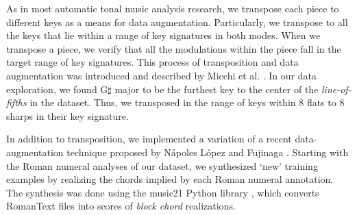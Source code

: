 

As in most automatic tonal music analysis research, we
transpose each piece to different keys as a means for data
augmentation. Particularly, we transpose to all the keys
that lie within a range of key signatures in both modes.
When we transpose a piece, we verify that all the
modulations within the piece fall in the target range of key
signatures. This process of transposition and data
augmentation was introduced and described by Micchi et al.
\parencite{micchi2020not}. In our data exploration, we found
G$\sharp$ major to be the furthest key to the center of the
\emph{line-of-fifths} \parencite{temperley2000line} in the
dataset. Thus, we transposed in the range of keys within 8
flats to 8 sharps in their key signature.


In addition to transposition, we implemented a variation of
a recent data-augmentation technique proposed by N\'apoles
L\'opez and Fujinaga \parencite{napoleslopez2020harmonic}.
Starting with the Roman numeral analyses of our dataset, we
synthesized `new' training examples by realizing the chords
implied by each Roman numeral annotation. The synthesis was
done using the music21 Python library
\parencite{cuthbert2010music21}, which converts RomanText
\parencite{gotham2019romantext} files into scores of \emph{block
chord} realizations.


